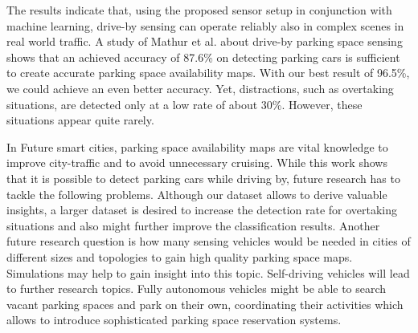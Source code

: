 The results indicate that, using the proposed sensor setup in conjunction with machine learning, drive-by sensing can operate reliably also in complex scenes in real world traffic. 
A study of Mathur et al. about drive-by parking space sensing \cite{Mathur:2010:PDS:1814433.1814448} shows that an achieved accuracy of 87.6\% on detecting parking cars is sufficient to create accurate parking space availability maps. With our best result of 96.5\%, we could achieve an even better accuracy.
Yet, distractions, such as overtaking situations, are detected only at a low rate of about 30\%. However, these situations appear quite rarely.

In Future smart cities, parking space availability maps are vital knowledge to improve city-traffic and to avoid unnecessary cruising.
While this work shows that it is possible to detect parking cars while driving by, future research has to tackle the following problems. Although our dataset allows to derive valuable insights, a larger dataset is desired to increase the detection rate for overtaking situations and also might further improve the classification results. Another future research question is how many sensing vehicles would be needed in cities of different sizes and topologies to gain high quality parking space maps. Simulations may help to gain insight into this topic. Self-driving vehicles will lead to further research topics. Fully autonomous vehicles might be able to search vacant parking spaces and park on their own, coordinating their activities which allows to introduce sophisticated parking space reservation systems.









